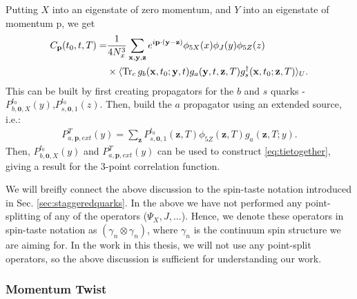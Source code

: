 Putting $X$ into an eigenstate of zero momentum, and $Y$ into an eigenstate of momentum ${\text{p}}$, we get
\begin{align}
  \nonumber
  C_{\textbf{p}}(t_0,t,T) =& {1\over 4 N_x^3} \sum_{{\textbf{x}},{\textbf{y}},{\textbf{z}}} e^{i{\textbf{p}}\cdot({\textbf{y}}-{\textbf{z}})} \phi_{5X}(x) \phi_J(y) \phi_{5Z}(z) \\ &\times\langle \text{Tr}_c\, g_{b}({\textbf{x}},t_0;{\textbf{y}},t) g_{a}({\textbf{y}},t,{\textbf{z}},T) g^{\dagger}_{s}({\textbf{x}},t_0;{\textbf{z}},T) \rangle_U.
  \label{eq:3ptfullexpr}
\end{align}
This can be built by first creating propagators for the $b$ and $s$ quarks - $P^{t_0}_{b,{\textbf{0}},X}(y)$,$P^{t_0}_{s,{\textbf{0}},1}(z)$. Then, build the $a$ propagator using an extended source, i.e.:
\begin{align}
  P^T_{a,{\textbf{p}},ext}(y) = \sum_{{\textbf{z}}} P^{t_0}_{s,{\textbf{0}},1}({\textbf{z}},T) \phi_{5Z}({\textbf{z}},T) g_{a}({\textbf{z}},T;y).
\end{align}
Then, $P^{t_0}_{b,{\textbf{0}},X}(y)$ and $P^T_{a,{\textbf{p}},ext}(y)$ can be used to construct \eqref{eq:tietogether}, giving a result for the 3-point correlation function.

We will breifly connect the above discussion to the spin-taste notation introduced in Sec. \ref{sec:staggeredquarks}. In the above we have not performed any point-splitting of any of the operators ($\Psi_X,J,...$). Hence, we denote these operators in spin-taste notation as $(\gamma_n\otimes \gamma_n)$, where $\gamma_n$ is the continuum spin structure we are aiming for. In the work in this thesis, we will not use any point-split operators, so the above discussion is sufficient for understanding our work.

\subsubsection{Momentum Twist}
\label{sec:momentum_twist}

